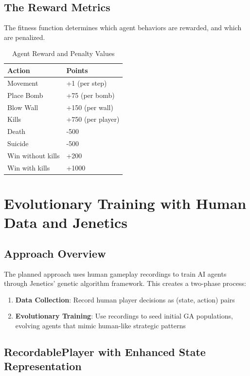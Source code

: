 \documentclass[sigconf]{acmart} %
\begin{document}
\subsection{The Reward Metrics}
The fitness function determines which agent behaviors are rewarded, and which are penalized.
\begin{table}[htbp]
\centering

\caption{Agent Reward and Penalty Values}

\begin{tabular}{l|l}
\textbf{Action} & \textbf{Points}  \\
\hline
Movement & +1 (per step) \\
\hline
Place Bomb & +75 (per bomb) \\
\hline
Blow Wall & +150 (per wall) \\
\hline
Kills & +750 (per player) \\
\hline
Death  & -500  \\
\hline
Suicide & -500 \\
\hline
Win without kills & +200  \\
\hline
Win with kills & +1000  \\
\hline
\end{tabular}
\end{table}


\section{Evolutionary Training with Human Data and Jenetics}
\label{sec:evo_train}  %
\subsection{Approach Overview}
The planned approach uses human gameplay recordings to train AI agents through Jenetics' genetic algorithm framework. This creates a two-phase process:
\begin{enumerate}
	\item \textbf{Data Collection}: Record human player decisions as (state, action) pairs
	\item \textbf{Evolutionary Training}: Use recordings to seed initial GA populations, evolving agents that mimic human-like strategic patterns
\end{enumerate}

\subsection{RecordablePlayer with Enhanced State Representation}
\label{subsec:recordable_player}
\end{document}
